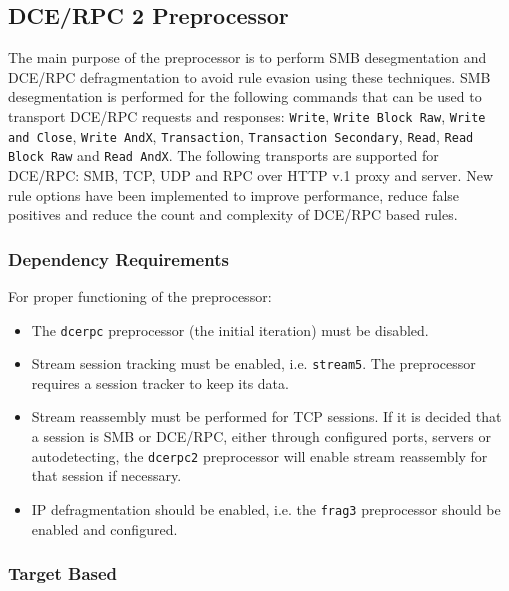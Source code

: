 \documentclass[english]{report}
\begin{document}
\subsection{DCE/RPC 2 Preprocessor}
\label{sub:dcerpc2}

The main purpose of the preprocessor is to perform SMB desegmentation and
DCE/RPC defragmentation to avoid rule evasion using these techniques.  SMB
desegmentation is performed for the following commands that can be used to
transport DCE/RPC requests and responses: \texttt{Write}, \texttt{Write Block
Raw}, \texttt{Write and Close}, \texttt{Write AndX}, \texttt{Transaction},
\texttt{Transaction Secondary}, \texttt{Read}, \texttt{Read Block Raw} and
\texttt{Read AndX}.  The following transports are supported for DCE/RPC: SMB,
TCP, UDP and RPC over HTTP v.1 proxy and server.  New rule options have been
implemented to improve performance, reduce false positives and reduce the count
and complexity of DCE/RPC based rules.

\subsubsection{Dependency Requirements}

For proper functioning of the preprocessor:

\begin{itemize}

\item The \texttt{dcerpc} preprocessor (the initial iteration) must be
disabled.

\item Stream session tracking must be enabled, i.e. \texttt{stream5}.  The
preprocessor requires a session tracker to keep its data.

\item Stream reassembly must be performed for TCP sessions. If it is decided
that a session is SMB or DCE/RPC, either through configured ports, servers or
autodetecting, the \texttt{dcerpc2} preprocessor will enable stream reassembly
for that session if necessary.

\item IP defragmentation should be enabled, i.e. the \texttt{frag3}
preprocessor should be enabled and configured.

\end{itemize}

\subsubsection{Target Based}
\end{document}
